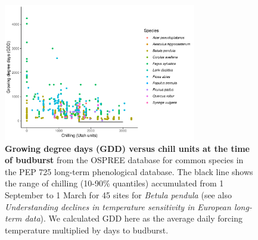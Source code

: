 \documentclass{article}
\begin{document}
\begin{figure}[h!]
\centering
\noindent \includegraphics[width=0.75\textwidth]{..//..//analyses/bb_analysis/figures/gddbyutah_pepspp.pdf}
\caption{\textbf{Growing degree days (GDD) versus chill units at the time of budburst} from the OSPREE database for common species in the PEP 725 long-term phenological database. The black line shows the range of chilling (10-90\% quantiles) accumulated from 1 September to 1 March for 45 sites for \emph{Betula pendula} (see also \emph{Understanding declines in temperature sensitivity in European long-term data}). We calculated GDD here as the average daily forcing temperature multiplied by days to budburst.}
\label{fig:pepgddchill}
\end{figure}

\end{document}

